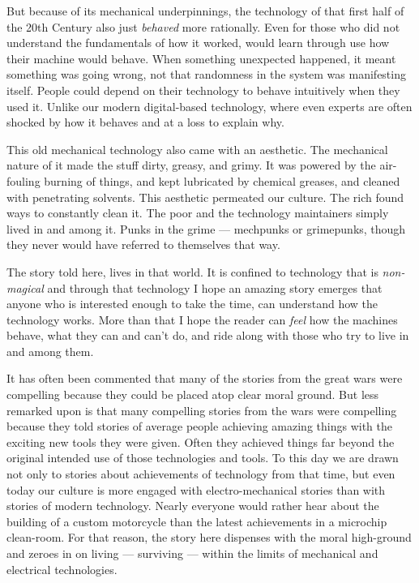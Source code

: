 \documentclass[]{article}
\begin{document}
\begin{multicols}{2}
But because of its mechanical underpinnings, the technology of that
first half of the 20th Century also just \emph{behaved} more rationally.
Even for those who did not understand the fundamentals of how it worked,
would learn through use how their machine would behave. When something
unexpected happened, it meant something was going wrong, not that
randomness in the system was manifesting itself. People could depend on
their technology to behave intuitively when they used it. Unlike our
modern digital-based technology, where even experts are often shocked by
how it behaves and at a loss to explain why.

This old mechanical technology also came with an aesthetic. The
mechanical nature of it made the stuff dirty, greasy, and grimy. It was
powered by the air-fouling burning of things, and kept lubricated by
chemical greases, and cleaned with penetrating solvents. This aesthetic
permeated our culture. The rich found ways to constantly clean it. The
poor and the technology maintainers simply lived in and among it. Punks
in the grime --- mechpunks or grimepunks, though they never would have
referred to themselves that way.

The story told here, lives in that world. It is confined to technology
that is \emph{non-magical} and through that technology I hope an amazing
story emerges that anyone who is interested enough to take the time, can
understand how the technology works. More than that I hope the reader
can \emph{feel} how the machines behave, what they can and can't do, and
ride along with those who try to live in and among them.

It has often been commented that many of the stories from the great wars
were compelling because they could be placed atop clear moral ground.
But less remarked upon is that many compelling stories from the wars
were compelling because they told stories of average people achieving
amazing things with the exciting new tools they were given. Often they
achieved things far beyond the original intended use of those
technologies and tools. To this day we are drawn not only to stories
about achievements of technology from that time, but even today our
culture is more engaged with electro-mechanical stories than with
stories of modern technology. Nearly everyone would rather hear about
the building of a custom motorcycle than the latest achievements in a
microchip clean-room. For that reason, the story here dispenses with the
moral high-ground and zeroes in on living --- surviving --- within the
limits of mechanical and electrical technologies.


\end{multicols}
\end{document}
